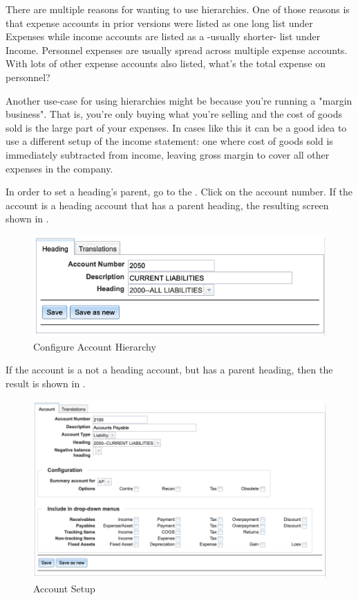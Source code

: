 There are multiple reasons for wanting to use hierarchies. One of those reasons is that expense accounts in prior versions were listed as one long list under Expenses while income accounts are listed as a -usually shorter- list under Income. Personnel expenses are usually spread across multiple expense accounts. With lots of other expense accounts also listed, what's the total expense on personnel?

Another use-case for using hierarchies might be because you're running a "margin business". That is, you're only buying what you're selling and the cost of goods sold is the large part of your expenses. In cases like this it can be a good idea to use a different setup of the income statement: one where cost of goods sold is immediately subtracted from income, leaving gross margin to cover all other expenses in the company.

In order to set a heading's parent, go to the . Click on the account number. If the account is a heading account that has a parent heading, the resulting screen shown in .

\begin{figure}[H]
    \centering
    \includegraphics[width=\graphicswidth]{images/gl-coa-heading.png}
    \caption{Configure Account Hierarchy}
    \label{fig:config-coa-hierarchy}
\end{figure}

If the account is a not a heading account, but has a parent heading, then the result is shown in .

\begin{figure}[H]
    \centering
    \includegraphics[width=\linewidth]{images/gl-coa.png}
    \caption{Account Setup}
    \label{fig:coa-account-setup}
\end{figure}

